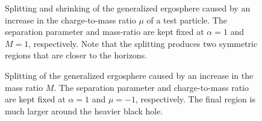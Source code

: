 \begin{figure}[!htbp]
{        \label{ch:penrose_binaries/fig:splitting_4}
    }
    \caption{Splitting and shrinking of the generalized ergosphere caused by an increase in the charge-to-mass ratio $\mu$ of a test particle. The separation parameter and mass-ratio are kept fixed at $\alpha = 1$ and $M = 1$, respectively. Note that the splitting produces two symmetric regions that are closer to the horizons.}
    \label{ch:penrose_binaries/fig:splitting_ergosphere_mass_increase}
\end{figure}

\begin{figure}[!htbp]
    \centering
    \caption{Splitting of the generalized ergosphere caused by an increase in the mass ratio $M$. The separation parameter and charge-to-mass ratio are kept fixed at $\alpha = 1$ and $\mu = -1$, respectively. The final region is much larger around the heavier black hole.}
    \label{ch:penrose_binaries/fig:splitting_ergosphere_mass_increase}
\end{figure}

